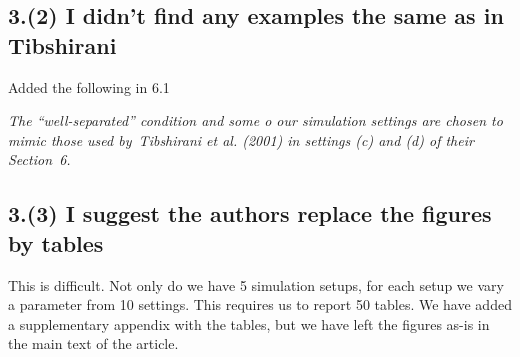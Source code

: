 \documentclass[11pt]{article}
\begin{document}
\subsection{3.(2) I didn't find any examples the same as in Tibshirani}

Added the following in 6.1

\emph{The ``well-separated'' condition and
some o our simulation settings are chosen to mimic those used by~Tibshirani
et al. (2001) in settings (c) and (d) of their Section~6.}

\subsection{3.(3) I suggest the authors replace the figures by tables}

This is difficult. Not only do we have 5 simulation setups, for each
setup we vary a parameter from 10 settings. This requires us to report 50
tables. We have added a supplementary appendix with the tables, but we have
left the figures as-is in the main text of the article.




\end{document}
